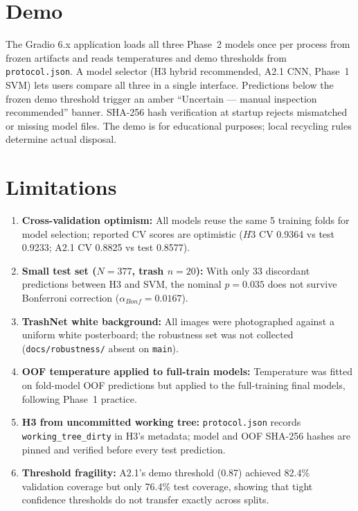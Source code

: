 \documentclass[conference]{IEEEtran}
\begin{document}
\section{Demo}
\label{sec:demo}
The Gradio 6.x application loads all three Phase~2 models once per process from frozen artifacts and reads temperatures and demo thresholds from \texttt{protocol.json}. A model selector (H3 hybrid recommended, A2.1 CNN, Phase~1 SVM) lets users compare all three in a single interface. Predictions below the frozen demo threshold trigger an amber ``Uncertain --- manual inspection recommended'' banner. SHA-256 hash verification at startup rejects mismatched or missing model files. The demo is for educational purposes; local recycling rules determine actual disposal.

\section{Limitations}
\label{sec:limits}
\begin{enumerate}
\item \textbf{Cross-validation optimism:} All models reuse the same 5 training folds for model selection; reported CV scores are optimistic ($H3$ CV 0.9364 vs test 0.9233; A2.1 CV 0.8825 vs test 0.8577).
\item \textbf{Small test set ($N=377$, trash $n=20$):} With only 33 discordant predictions between H3 and SVM, the nominal $p=0.035$ does not survive Bonferroni correction ($\alpha_{Bonf}=0.0167$).
\item \textbf{TrashNet white background:} All images were photographed against a uniform white posterboard; the robustness set was not collected (\texttt{docs/robustness/} absent on \texttt{main}).
\item \textbf{OOF temperature applied to full-train models:} Temperature was fitted on fold-model OOF predictions but applied to the full-training final models, following Phase~1 practice.
\item \textbf{H3 from uncommitted working tree:} \texttt{protocol.json} records \texttt{working\_tree\_dirty} in H3's metadata; model and OOF SHA-256 hashes are pinned and verified before every test prediction.
\item \textbf{Threshold fragility:} A2.1's demo threshold (0.87) achieved 82.4\% validation coverage but only 76.4\% test coverage, showing that tight confidence thresholds do not transfer exactly across splits.
\end{enumerate}
\end{document}

